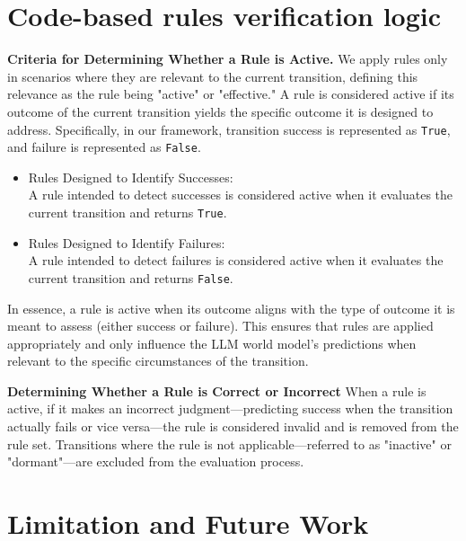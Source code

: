 \documentclass{article} %
\begin{document}
\section{Code-based rules verification logic}
\label{sec:verification logic}

\textbf{Criteria for Determining Whether a Rule is Active.}
We apply rules only in scenarios where they are relevant to the current transition, defining this relevance as the rule being "active" or "effective." 
A rule is considered active if its outcome of the current transition yields the specific outcome it is designed to address. Specifically, in our framework, transition success is represented as \texttt{True}, and failure is represented as \texttt{False}.
\begin{itemize}
    \item Rules Designed to Identify Successes:\\
    A rule intended to detect successes is considered active when it evaluates the current transition and returns \texttt{True}.
    \item Rules Designed to Identify Failures:\\
    A rule intended to detect failures is considered active when it evaluates the current transition and returns \texttt{False}.
\end{itemize}
In essence, a rule is active when its outcome aligns with the type of outcome it is meant to assess (either success or failure). This ensures that rules are applied appropriately and only influence the LLM world model's predictions when relevant to the specific circumstances of the transition.


\textbf{Determining Whether a Rule is Correct or Incorrect}
When a rule is active, if it makes an incorrect judgment—predicting success when the transition actually fails or vice versa—the rule is considered invalid and is removed from the rule set. Transitions where the rule is not applicable—referred to as "inactive" or "dormant"—are excluded from the evaluation process. 





\section{Limitation and Future Work}
\end{document}
